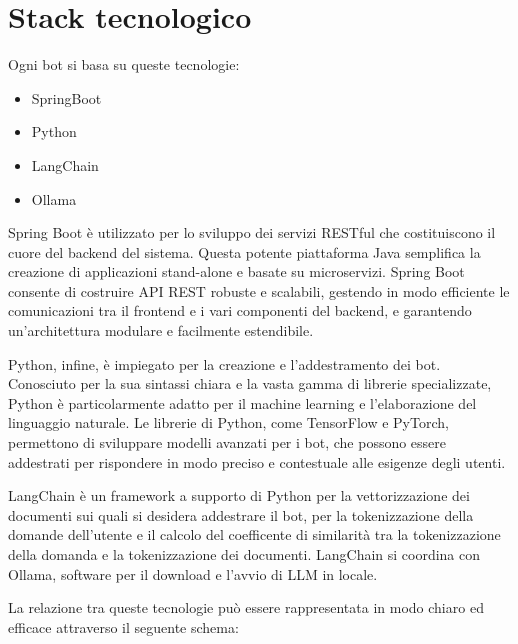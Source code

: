 \documentclass[a4paper,twoside,12pt]{toptesi}
\begin{document}
\section{Stack tecnologico}

Ogni bot si basa su queste tecnologie:

\begin{itemize}
	\item SpringBoot
	\item Python
	\item LangChain
	\item Ollama
\end{itemize} 

Spring Boot è utilizzato per lo sviluppo dei servizi RESTful che costituiscono il cuore del backend del sistema. Questa potente piattaforma Java semplifica la creazione di applicazioni stand-alone e basate su microservizi. Spring Boot consente di costruire API REST robuste e scalabili, gestendo in modo efficiente le comunicazioni tra il frontend e i vari componenti del backend, e garantendo un'architettura modulare e facilmente estendibile.

Python, infine, è impiegato per la creazione e l'addestramento dei bot. Conosciuto per la sua sintassi chiara e la vasta gamma di librerie specializzate, Python è particolarmente adatto per il machine learning e l'elaborazione del linguaggio naturale. Le librerie di Python, come TensorFlow e PyTorch, permettono di sviluppare modelli avanzati per i bot, che possono essere addestrati per rispondere in modo preciso e contestuale alle esigenze degli utenti.

LangChain è un framework a supporto di Python per la vettorizzazione dei documenti sui quali si desidera addestrare il bot, per la tokenizzazione della domande dell'utente e il calcolo del coefficente di similarità tra la tokenizzazione della domanda e la tokenizzazione dei documenti. LangChain si coordina con Ollama, software per il download e l'avvio di LLM in locale.

La relazione tra queste tecnologie può essere rappresentata in modo chiaro ed efficace attraverso il seguente schema:
\begin{center}


\end{center}
\end{document}
